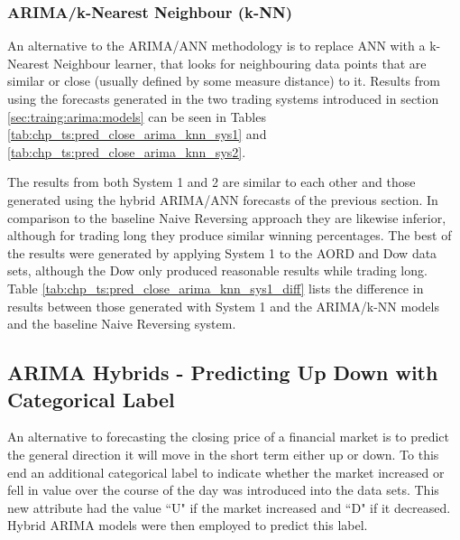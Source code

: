 

\subsubsection{ARIMA/k-Nearest Neighbour (k-NN)}
An alternative to the ARIMA/ANN methodology is to replace ANN with a k-Nearest Neighbour learner, that looks for neighbouring data points that are similar or close (usually defined by some measure distance) to it. Results from using the forecasts generated in the two trading systems introduced in section \ref{sec:traing:arima:models} can be seen in Tables \ref{tab:chp_ts:pred_close_arima_knn_sys1} and \ref{tab:chp_ts:pred_close_arima_knn_sys2}. 

The results from both System 1 and 2 are similar to each other and those generated using the hybrid ARIMA/ANN forecasts of the previous section. In comparison to the baseline Naive Reversing approach they are likewise inferior, although for trading long they produce similar winning percentages. The best of the results were generated by applying System 1 to the AORD and Dow data sets, although the Dow only produced reasonable results while trading long. Table \ref{tab:chp_ts:pred_close_arima_knn_sys1_diff} lists the difference in results between those generated with System 1 and the ARIMA/k-NN models and the baseline Naive Reversing system.



\subsection{ARIMA Hybrids - Predicting Up Down with Categorical Label}
An alternative to forecasting the closing price of a financial market is to predict the general direction it will move in the short term either up or down. To this end an additional categorical label to indicate whether the market increased or fell in value over the course of the day was introduced into the data sets. This new attribute had the value  \textquotedblleft U" if the market increased and \textquotedblleft D" if it decreased. Hybrid ARIMA models were then employed to predict this label.

